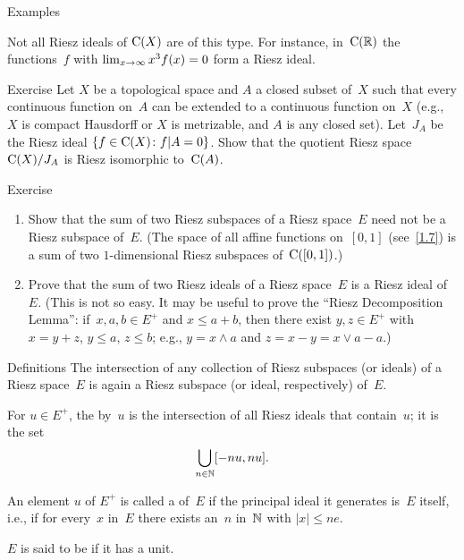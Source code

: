 \documentclass[main.tex]{subfiles}
\begin{document}
\begin{psec}{2.8}{Examples}
\begin{enumerate}
Not all Riesz ideals of $\mathrm{C}(X)$ are of this type.
For instance,
in~$\mathrm{C}(\mathbb{R})$ the functions~$f$
with $\lim_{x\rightarrow \infty} x^3 f(x)=0$
form a Riesz ideal.
\end{enumerate}
\end{psec}
%
%
\begin{psec}{2.9}{Exercise}
Let $X$ be a topological space
and $A$ a closed subset of~$X$ 
such that every continuous function on~$A$
can be extended to a continuous function on~$X$ 
(e.g., $X$ is compact Hausdorff or $X$ is metrizable,
and $A$ is any closed set).
Let~$J_A$ be the Riesz ideal
$\{f\in\mathrm{C}(X)\colon f|A=0\}$.
Show that the quotient Riesz space
$\mathrm{C}(X)/J_A$ is Riesz isomorphic to~$\mathrm{C}(A)$.
\end{psec}
%
%
\begin{psec}{2.10}{Exercise}
\begin{enumerate}
\item \label{2.10-1}
Show that the sum of two Riesz subspaces 
of a Riesz space~$E$ need not be a Riesz subspace of~$E$.
(The space of all affine functions on~$[0,1]$ (see~\ref{1.7})
is a sum of two $1$-dimensional Riesz subspaces of~$\mathrm{C}([0,1])$.)
%
\item \label{2.10-2}
Prove that the sum of two Riesz ideals
of a Riesz space~$E$
is a Riesz ideal of~$E$.
(This is not so easy.
It may be useful to prove
the ``Riesz Decomposition Lemma'':
if~$x,a,b\in E^+$ and $x\leq a+b$,
then there exist $y,z\in E^+$ 
with $x=y+z$, $y\leq a$, $z\leq b$;
e.g., $y=x\wedge a$ and $z=x-y=x\vee a-a$.)
\end{enumerate}
\end{psec}
%
%
\begin{psec}{2.11}{Definitions}
The intersection of any collection of Riesz subspaces
(or ideals) of a Riesz space~$E$ 
is again a Riesz subspace
(or ideal, respectively)
of~$E$.

For $u\in E^+$, 
the  by~$u$ 
is the intersection of all Riesz ideals
that contain~$u$;
it is the set
\begin{equation*}
\bigcup_{n\in\mathbb{N}} [-nu,nu]
\text{.}
\end{equation*}

An element $u$ of $E^+$
is called 
a  of~$E$
if the principal ideal it generates is~$E$ itself,
i.e., 
if for every~$x$ in~$E$
there exists an~$n$ in~$\mathbb{N}$ with $|x|\leq ne$.

$E$ is said to be  if it has a unit.
\end{psec}
\clearpage
\end{document}
